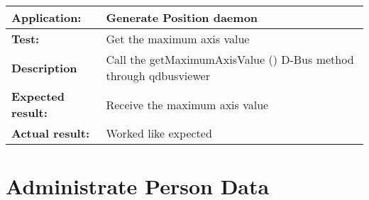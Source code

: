    \begin{tabular}{|p{3.5cm}|p{10.5cm}|}
    \hline
     \textbf{Application:}	& Generate Position daemon\\
    \hline
     \textbf{Test:}		& Get the maximum axis value\\
    \hline
     \textbf{Description}	& Call the getMaximumAxisValue () D-Bus method through qdbusviewer\\
    \hline
     \textbf{Expected result:}	& Receive the maximum axis value\\
    \hline
     \textbf{Actual result:}	& Worked like expected\\
    \hline
   \end{tabular}

 \section{Administrate Person Data}

